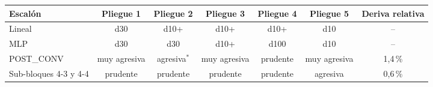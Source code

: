 \begin{tabular}{lcccccc}
\toprule
Escal\'on & Pliegue 1 & Pliegue 2 & Pliegue 3 & Pliegue 4 & Pliegue 5 & Deriva relativa\\
\midrule
Lineal & d30 & d10+ & d10+ & d10+ & d10 & --\\
MLP & d30 & d30 & d10+ & d100 & d10 & --\\
POST\_CONV & muy agresiva & agresiva$^{*}$ & muy agresiva & prudente & muy agresiva & 1{,}4\,\%\\
Sub-bloques 4-3 y 4-4 & prudente & prudente & prudente & prudente & agresiva & 0{,}6\,\%\\
\bottomrule
\end{tabular}

